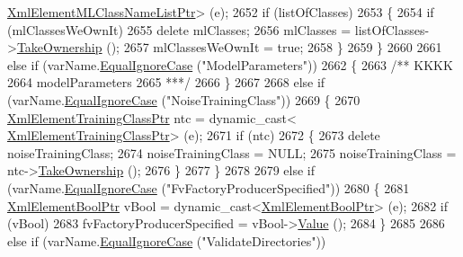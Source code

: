 \begin{DoxyCode}
      \hyperlink{class_k_k_m_l_l_1_1_xml_element_m_l_class_name_list}{XmlElementMLClassNameListPtr}\textcolor{keyword}{>} (e);
2652       \textcolor{keywordflow}{if}  (listOfClasses)
2653       \{
2654         \textcolor{keywordflow}{if}  (mlClassesWeOwnIt)
2655           \textcolor{keyword}{delete}  mlClasses;
2656         mlClasses = listOfClasses->\hyperlink{class_k_k_m_l_l_1_1_xml_element_m_l_class_name_list_ae2f69705f49c3e4246363ff01fcba962}{TakeOwnership} ();
2657         mlClassesWeOwnIt = \textcolor{keyword}{true};
2658       \}
2659     \}
2660 
2661     \textcolor{keywordflow}{else} \textcolor{keywordflow}{if}  (varName.\hyperlink{class_k_k_b_1_1_k_k_str_a562f9696417c53f66bc4088eac072ab5}{EqualIgnoreCase}  (\textcolor{stringliteral}{"ModelParameters"}))
2662     \{\textcolor{comment}{}
2663 \textcolor{comment}{      /** KKKK}
2664 \textcolor{comment}{       modelParameters}
2665 \textcolor{comment}{      ***/}
2666     \}
2667 
2668     \textcolor{keywordflow}{else} \textcolor{keywordflow}{if}  (varName.\hyperlink{class_k_k_b_1_1_k_k_str_a562f9696417c53f66bc4088eac072ab5}{EqualIgnoreCase}  (\textcolor{stringliteral}{"NoiseTrainingClass"}))
2669     \{
2670       \hyperlink{class_k_k_b_1_1_xml_element_template}{XmlElementTrainingClassPtr}  ntc = \textcolor{keyword}{dynamic\_cast<}
      \hyperlink{class_k_k_b_1_1_xml_element_template}{XmlElementTrainingClassPtr}\textcolor{keyword}{>} (e);
2671       \textcolor{keywordflow}{if}  (ntc)
2672       \{
2673         \textcolor{keyword}{delete}  noiseTrainingClass;
2674         noiseTrainingClass = NULL;
2675         noiseTrainingClass = ntc->\hyperlink{class_k_k_b_1_1_xml_element_template_a1fd0ce7b0d0ee0d57fb29ca09d3ad6fc}{TakeOwnership} ();
2676       \}
2677     \}
2678 
2679     \textcolor{keywordflow}{else} \textcolor{keywordflow}{if}  (varName.\hyperlink{class_k_k_b_1_1_k_k_str_a562f9696417c53f66bc4088eac072ab5}{EqualIgnoreCase}  (\textcolor{stringliteral}{"FvFactoryProducerSpecified"}))
2680     \{
2681       \hyperlink{class_k_k_b_1_1_xml_element_bool}{XmlElementBoolPtr}  vBool = \textcolor{keyword}{dynamic\_cast<}\hyperlink{class_k_k_b_1_1_xml_element_bool}{XmlElementBoolPtr}\textcolor{keyword}{>} (e);
2682       \textcolor{keywordflow}{if}  (vBool)
2683         fvFactoryProducerSpecified = vBool->\hyperlink{class_k_k_b_1_1_xml_element_bool_a8d4ec6615a74cca30a79d288d08cccd0}{Value} ();
2684     \}
2685 
2686     \textcolor{keywordflow}{else} \textcolor{keywordflow}{if}  (varName.\hyperlink{class_k_k_b_1_1_k_k_str_a562f9696417c53f66bc4088eac072ab5}{EqualIgnoreCase}  (\textcolor{stringliteral}{"ValidateDirectories"}))

\end{DoxyCode}
